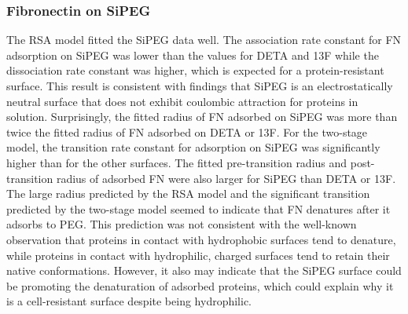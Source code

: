 \subsubsection{Fibronectin on SiPEG}

The RSA model fitted the SiPEG data well. The association rate constant
for FN adsorption on SiPEG was lower than the values for DETA and
13F while the dissociation rate constant was higher, which is expected
for a protein-resistant surface. This result is consistent with findings
that SiPEG is an electrostatically neutral surface that does not exhibit
coulombic attraction for proteins in solution. Surprisingly, the fitted
radius of FN adsorbed on SiPEG was more than twice the fitted radius
of FN adsorbed on DETA or 13F. For the two-stage model, the transition
rate constant for adsorption on SiPEG was significantly higher than
for the other surfaces. The fitted pre-transition radius and post-transition
radius of adsorbed FN were also larger for SiPEG than DETA or 13F.
The large radius predicted by the RSA model and the significant transition
predicted by the two-stage model seemed to indicate that FN denatures
after it adsorbs to PEG. This prediction was not consistent with the
well-known observation that proteins in contact with hydrophobic surfaces
tend to denature, while proteins in contact with hydrophilic, charged
surfaces tend to retain their native conformations. However, it also
may indicate that the SiPEG surface could be promoting the denaturation
of adsorbed proteins, which could explain why it is a cell-resistant
surface despite being hydrophilic. 

